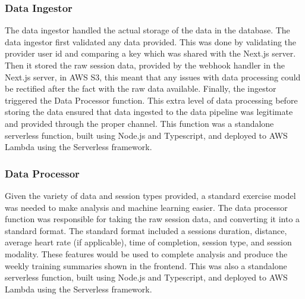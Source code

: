 \subsubsection{Data Ingestor}
The data ingestor handled the actual storage of the data in the database. The data ingestor first validated any data provided. This was done by validating the provider user id and comparing a key which was shared with the Next.js server. Then it stored the raw session data, provided by the webhook handler in the Next.js server, in AWS S3, this meant that any issues with data processing could be rectified after the fact with the raw data available. Finally, the ingestor triggered the Data Processor function. This extra level of data processing before storing the data ensured that data ingested to the data pipeline was legitimate and provided through the proper channel. This function was a standalone serverless function, built using Node.js and Typescript, and deployed to AWS Lambda using the Serverless framework.

\subsubsection{Data Processor}
Given the variety of data and session types provided, a standard exercise model was needed to make analysis and machine learning easier. The data processor function was responsible for taking the raw session data, and converting it into a standard format. The standard format included a sessions duration, distance, average heart rate (if applicable), time of completion, session type, and session modality. These features would be used to complete analysis and produce the weekly training summaries shown in the frontend. This was also a standalone serverless function, built using Node.js and Typescript, and deployed to AWS Lambda using the Serverless framework.

